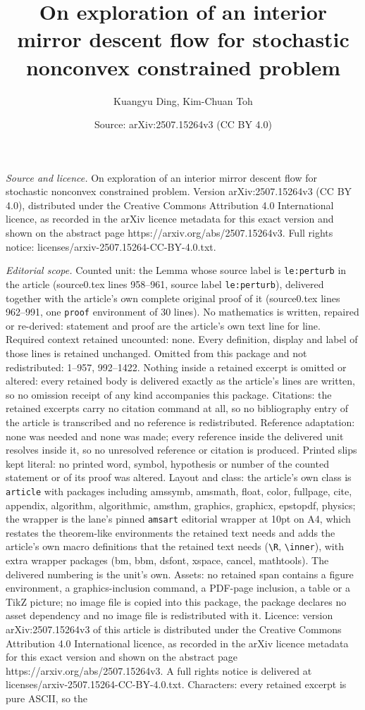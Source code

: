 \documentclass[10pt,a4paper]{amsart}
\title[On exploration of an interior mirror descent flow for stocha]{On exploration of an interior mirror descent flow for stochastic nonconvex constrained problem}
\author{Kuangyu Ding, Kim-Chuan Toh}
\date{Source: arXiv:2507.15264v3 (CC BY 4.0)}
\begin{document}
\maketitle

\noindent\emph{Source and licence.} On exploration of an interior mirror descent flow for stochastic nonconvex constrained problem. Version arXiv:2507.15264v3 (CC BY 4.0), distributed under the Creative Commons Attribution 4.0 International licence, as recorded in the arXiv licence metadata for this exact version and shown on the abstract page https://arxiv.org/abs/2507.15264v3. Full rights notice: licenses/arxiv-2507.15264-CC-BY-4.0.txt.\par\smallskip

\noindent\textit{Editorial scope.} Counted unit: the Lemma whose source label is \texttt{le:perturb} in the article (source0.tex lines 958--961, source label \texttt{le:perturb}), delivered together with the article's own complete original proof of it (source0.tex lines 962--991, one \texttt{proof} environment of 30 lines). No mathematics is written, repaired or re-derived: statement and proof are the article's own text line for line. Required context retained uncounted: none. Every definition, display and label of those lines is retained unchanged. Omitted from this package and not redistributed: 1--957, 992--1422. Nothing inside a retained excerpt is omitted or altered: every retained body is delivered exactly as the article's lines are written, so no omission receipt of any kind accompanies this package. Citations: the retained excerpts carry no citation command at all, so no bibliography entry of the article is transcribed and no reference is redistributed. Reference adaptation: none was needed and none was made; every reference inside the delivered unit resolves inside it, so no unresolved reference or citation is produced. Printed slips kept literal: no printed word, symbol, hypothesis or number of the counted statement or of its proof was altered. Layout and class: the article's own class is \texttt{article} with packages including amssymb, amsmath, float, color, fullpage, cite, appendix, algorithm, algorithmic, amsthm, graphics, graphicx, epstopdf, physics; the wrapper is the lane's pinned \texttt{amsart} editorial wrapper at 10pt on A4, which restates the theorem-like environments the retained text needs and adds the article's own macro definitions that the retained text needs (\texttt{\textbackslash R}, \texttt{\textbackslash inner}), with extra wrapper packages (bm, bbm, dsfont, xspace, cancel, mathtools). The delivered numbering is the unit's own. Assets: no retained span contains a figure environment, a graphics-inclusion command, a PDF-page inclusion, a table or a TikZ picture; no image file is copied into this package, the package declares no asset dependency and no image file is redistributed with it. Licence: version arXiv:2507.15264v3 of this article is distributed under the Creative Commons Attribution 4.0 International licence, as recorded in the arXiv licence metadata for this exact version and shown on the abstract page https://arxiv.org/abs/2507.15264v3. A full rights notice is delivered at licenses/arxiv-2507.15264-CC-BY-4.0.txt. Characters: every retained excerpt is pure ASCII, so the 
\end{document}

